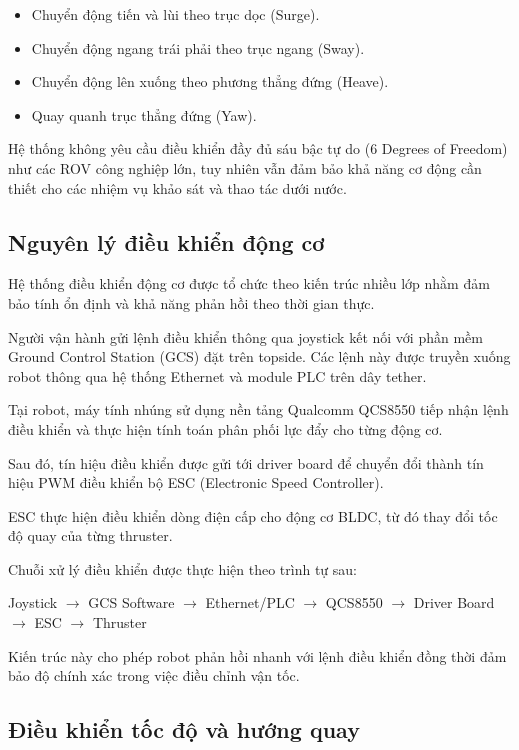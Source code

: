 \documentclass[../DoAn.tex]{subfiles}
\begin{document}
\begin{itemize}
    \item Chuyển động tiến và lùi theo trục dọc (Surge).
    \item Chuyển động ngang trái phải theo trục ngang (Sway).
    \item Chuyển động lên xuống theo phương thẳng đứng (Heave).
    \item Quay quanh trục thẳng đứng (Yaw).
\end{itemize}

Hệ thống không yêu cầu điều khiển đầy đủ sáu bậc tự do (6 Degrees of Freedom) như các ROV công nghiệp lớn, tuy nhiên vẫn đảm bảo khả năng cơ động cần thiết cho các nhiệm vụ khảo sát và thao tác dưới nước.

\subsection{Nguyên lý điều khiển động cơ}

Hệ thống điều khiển động cơ được tổ chức theo kiến trúc nhiều lớp nhằm đảm bảo tính ổn định và khả năng phản hồi theo thời gian thực.

Người vận hành gửi lệnh điều khiển thông qua joystick kết nối với phần mềm Ground Control Station (GCS) đặt trên topside. Các lệnh này được truyền xuống robot thông qua hệ thống Ethernet và module PLC trên dây tether.

Tại robot, máy tính nhúng sử dụng nền tảng 
Qualcomm QCS8550 
tiếp nhận lệnh điều khiển và thực hiện tính toán phân phối lực đẩy cho từng động cơ.

Sau đó, tín hiệu điều khiển được gửi tới driver board để chuyển đổi thành tín hiệu PWM điều khiển bộ ESC (Electronic Speed Controller).

ESC thực hiện điều khiển dòng điện cấp cho động cơ BLDC, từ đó thay đổi tốc độ quay của từng thruster.

Chuỗi xử lý điều khiển được thực hiện theo trình tự sau:

\begin{center}
Joystick $\rightarrow$ GCS Software $\rightarrow$ Ethernet/PLC $\rightarrow$ QCS8550 $\rightarrow$ Driver Board $\rightarrow$ ESC $\rightarrow$ Thruster
\end{center}

Kiến trúc này cho phép robot phản hồi nhanh với lệnh điều khiển đồng thời đảm bảo độ chính xác trong việc điều chỉnh vận tốc.

\subsection{Điều khiển tốc độ và hướng quay}
\end{document}
